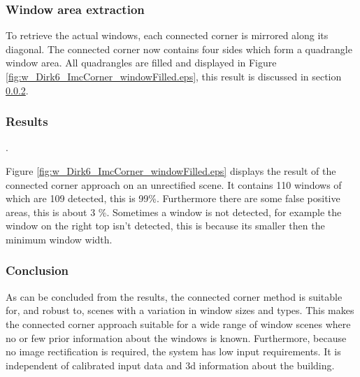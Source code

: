 \subsubsection{Window area extraction}
To retrieve the actual windows, each connected corner is mirrored along its
diagonal. The connected corner now contains four sides which form a 
quadrangle window area.
All quadrangles are filled and displayed in Figure
\ref{fig:w_Dirk6_ImcCorner_windowFilled.eps}, this result is discussed in section
\ref{sec:results}.


\subsubsection{Results}
\label{sec:results}.


\newpage
{}
\clearpage

Figure \ref{fig:w_Dirk6_ImcCorner_windowFilled.eps} displays the result of the
connected corner approach on an unrectified scene.  It contains 110 windows of
which are 109 detected, this is 99\%. Furthermore there are some false positive
areas, this is about 3 \%.
Sometimes a window is not detected, for example the window on the right top
isn't detected, this is because its smaller then the minimum window width.\\

\subsubsection{Conclusion}
As can be concluded from the results, the connected corner method is suitable
for, and robust to, scenes with a variation in window sizes and types. This
	makes the connected corner approach suitable for a wide range of window
	scenes where no or few prior information about the windows is known.
	Furthermore, because no image rectification is required, the system has low input
	requirements. It is independent of calibrated input data and 3d information
	about the building.

